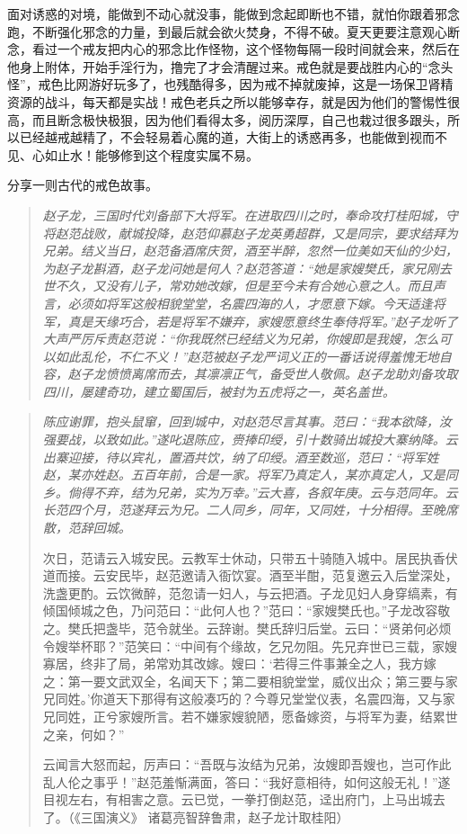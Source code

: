面对诱惑的对境，能做到不动心就没事，能做到念起即断也不错，就怕你跟着邪念跑，不断强化邪念的力量，到最后就会欲火焚身，不得不破。夏天更要注意观心断念，看过一个戒友把内心的邪念比作怪物，这个怪物每隔一段时间就会来，然后在他身上附体，开始手淫行为，撸完了才会清醒过来。戒色就是要战胜内心的“念头怪”，戒色比网游好玩多了，也残酷得多，因为戒不掉就废掉，这是一场保卫肾精资源的战斗，每天都是实战！戒色老兵之所以能够幸存，就是因为他们的警惕性很高，而且断念极快极狠，因为他们看得太多，阅历深厚，自己也栽过很多跟头，所以已经越戒越精了，不会轻易着心魔的道，大街上的诱惑再多，也能做到视而不见、心如止水！能够修到这个程度实属不易。

分享一则古代的戒色故事。

\begin{quote}\it
    赵子龙，三国时代刘备部下大将军。在进取四川之时，奉命攻打桂阳城，守将赵范战败，献城投降，赵范仰慕赵子龙英勇超群，又是同宗，要求结拜为兄弟。结义当日，赵范备酒席庆贺，酒至半醉，忽然一位美如天仙的少妇，为赵子龙斟酒，赵子龙问她是何人？赵范答道：“她是家嫂樊氏，家兄刚去世不久，又没有儿子，常劝她改嫁，但是至今未有合她心意之人。而且声言，必须如将军这般相貌堂堂，名震四海的人，才愿意下嫁。今天适逢将军，真是天缘巧合，若是将军不嫌弃，家嫂愿意终生奉侍将军。”赵子龙听了大声严厉斥责赵范说：“你我既然已经结义为兄弟，你嫂即是我嫂，怎么可以如此乱伦，不仁不义！”赵范被赵子龙严词义正的一番话说得羞愧无地自容，赵子龙愤愤离席而去，其凛凛正气，备受世人敬佩。赵子龙助刘备攻取四川，屡建奇功，建立蜀国后，被封为五虎将之一，英名盖世。
\end{quote}

\begin{quotation}\it
    陈应谢罪，抱头鼠窜，回到城中，对赵范尽言其事。范曰：“我本欲降，汝强要战，以致如此。”遂叱退陈应，赍捧印绶，引十数骑出城投大寨纳降。云出寨迎接，待以宾礼，置酒共饮，纳了印绶。酒至数巡，范曰：“将军姓赵，某亦姓赵。五百年前，合是一家。将军乃真定人，某亦真定人，又是同乡。倘得不弃，结为兄弟，实为万幸。”云大喜，各叙年庚。云与范同年。云长范四个月，范遂拜云为兄。二人同乡，同年，又同姓，十分相得。至晚席散，范辞回城。

    次日，范请云入城安民。云教军士休动，只带五十骑随入城中。居民执香伏道而接。云安民毕，赵范邀请入衙饮宴。酒至半酣，范复邀云入后堂深处，洗盏更酌。云饮微醉，范忽请一妇人，与云把酒。子龙见妇人身穿缟素，有倾国倾城之色，乃问范曰：“此何人也？”范曰：“家嫂樊氏也。”子龙改容敬之。樊氏把盏毕，范令就坐。云辞谢。樊氏辞归后堂。云曰：“贤弟何必烦令嫂举杯耶？”范笑曰：“中间有个缘故，乞兄勿阻。先兄弃世已三载，家嫂寡居，终非了局，弟常劝其改嫁。嫂曰：‘若得三件事兼全之人，我方嫁之：第一要文武双全，名闻天下；第二要相貌堂堂，威仪出众；第三要与家兄同姓。’你道天下那得有这般凑巧的？今尊兄堂堂仪表，名震四海，又与家兄同姓，正兮家嫂所言。若不嫌家嫂貌陋，愿备嫁资，与将军为妻，结累世之亲，何如？”

    云闻言大怒而起，厉声曰：“吾既与汝结为兄弟，汝嫂即吾嫂也，岂可作此乱人伦之事乎！”赵范羞惭满面，答曰：“我好意相待，如何这般无礼！”遂目视左右，有相害之意。云已觉，一拳打倒赵范，迳出府门，上马出城去了。（《三国演义》 诸葛亮智辞鲁肃，赵子龙计取桂阳）
\end{quotation}

